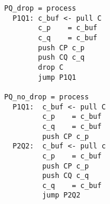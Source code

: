 \begin{lstlisting}
PQ_drop = process
  P1Q1: c_buf <- pull C
        c_p    = c_buf
        c_q    = c_buf
        push CP c_p
        push CQ c_q
        drop C
        jump P1Q1

PQ_no_drop = process
  P1Q1:  c_buf <- pull C
         c_p    = c_buf
         c_q    = c_buf
         push CP c_p
  P2Q2:  c_buf <- pull c
         c_p    = c_buf
         push CP c_p
         push CQ c_q
         c_q    = c_buf
         jump P2Q2
\end{lstlisting}



